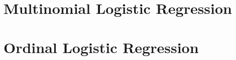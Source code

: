 \documentclass{beamer}
\begin{document}

\section{Multinomial Logistic Regression}



\section{Ordinal Logistic Regression}










\end{document}
